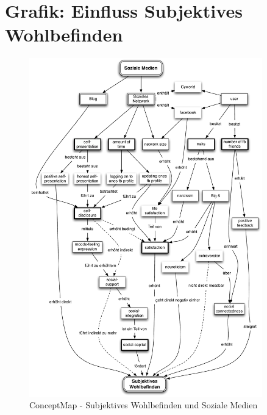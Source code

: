 \section{Grafik: Einfluss Subjektives Wohlbefinden}\label{sec.anhangGrafik}
\begin{figure}[H]
	\centering
		\includegraphics[width=0.9\textwidth]{images/grafiken/conceptMap_Swb_Sm_v2.pdf}
	\caption{ConceptMap - Subjektives Wohlbefinden und Soziale Medien}
	\label{fig.ConceptMapSwbSmAnhang}
\end{figure}
